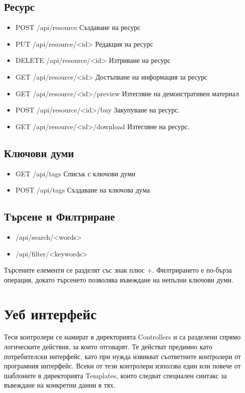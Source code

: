 \subsection{Ресурс}
\begin{itemize}
    \item POST /api/resource
        Създаване на ресурс
    \item PUT /api/resource/<id>
        Редакция на ресурс
    \item DELETE /api/resource/<id>
        Изтриване на ресурс
    \item GET /api/resource/<id>
        Достъпване на информация за ресурс
    \item GET /api/resource/<id>/preview
        Изтегляне на демонстративен материал
    \item POST /api/resource/<id>/buy
        Закупуване на ресурс.
    \item GET /api/resource/<id>/download
        Изтегляне на ресурс.
\end{itemize}

\subsection{Ключови думи}
\begin{itemize}
    \item GET /api/tags
        Списък с ключови думи
    \item POST /api/tags
        Създаване на ключова дума
\end{itemize}

\subsection{Търсене и Филтриране}
\begin{itemize}
    \item /api/search/<words>
    \item /api/filter/<keywords>
\end{itemize}
Търсените елементи се разделят със знак плюс +.
Филтрирането е по-бърза операция, докато търсенето
позволява въвеждане на непълни ключови думи.

\section{Уеб интерфейс}
Теси контролери се намират в директорията Controllers
и са разделени спрямо логическите действия, за които
отговарят. Те действат предимно като потребителски
интерфейс, като при нужда извикват съответните контролери
от програмния интерфейс.
Всеки от тези контролери използва един или повече от
шаблоните в директорията Templates, които следват
специален синтакс за въвеждане на конкретни данни в тях.

